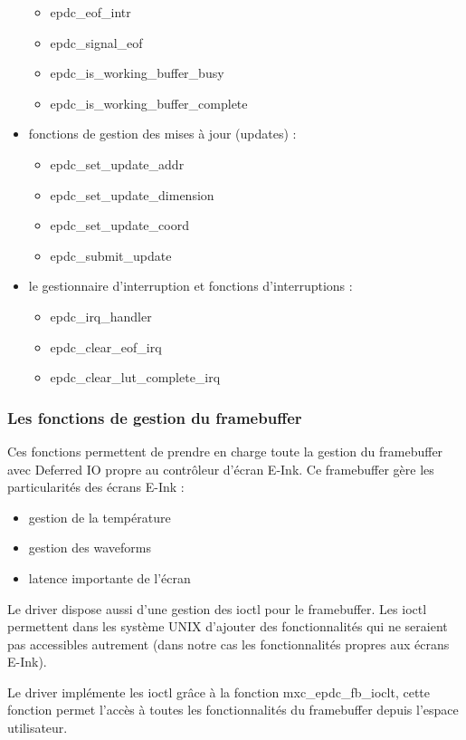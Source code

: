 \begin{itemize}
\begin{itemize}
			\item epdc\_eof\_intr
			\item epdc\_signal\_eof
			\item epdc\_is\_working\_buffer\_busy
			\item epdc\_is\_working\_buffer\_complete
		\end{itemize}
	\item fonctions de gestion des mises à jour (updates) : 
		\begin{itemize}
			\item epdc\_set\_update\_addr
			\item epdc\_set\_update\_dimension
			\item epdc\_set\_update\_coord
			\item epdc\_submit\_update
		\end{itemize}
	\item le gestionnaire d'interruption et fonctions d'interruptions : 
	\begin{itemize}
		\item epdc\_irq\_handler
		\item epdc\_clear\_eof\_irq
		\item epdc\_clear\_lut\_complete\_irq
	\end{itemize}
\end{itemize}

\subsubsection{Les fonctions de gestion du framebuffer}

Ces fonctions permettent de prendre en charge toute la gestion du framebuffer avec Deferred IO 
propre au contrôleur d'écran E-Ink.
Ce framebuffer gère les particularités des écrans E-Ink : 
	\begin{itemize}
		\item gestion de la température
		\item gestion des waveforms
		\item latence importante de l'écran
	\end{itemize}

Le driver dispose aussi d'une gestion des ioctl pour le framebuffer.
Les ioctl permettent dans les système UNIX d'ajouter des fonctionnalités qui ne seraient pas accessibles autrement (dans notre cas les fonctionnalités propres aux écrans E-Ink).

Le driver implémente les ioctl grâce à la fonction mxc\_epdc\_fb\_ioclt, cette fonction permet l'accès à toutes les fonctionnalités du framebuffer depuis l'espace utilisateur.

